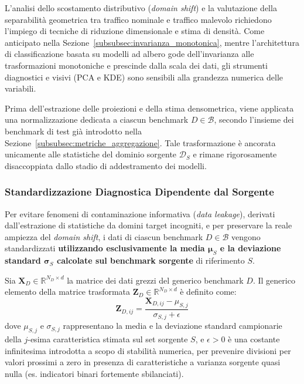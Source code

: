 L'analisi dello scostamento distributivo (\textit{domain shift}) e la valutazione della separabilità geometrica tra traffico nominale e traffico malevolo richiedono l'impiego di tecniche di riduzione dimensionale e stima di densità. Come anticipato nella Sezione~\ref{subsubsec:invarianza_monotonica}, mentre l'architettura di classificazione basata su modelli ad albero gode dell'invarianza alle trasformazioni monotoniche e prescinde dalla scala dei dati, gli strumenti diagnostici e visivi (PCA e KDE) sono sensibili alla grandezza numerica delle variabili.

Prima dell'estrazione delle proiezioni e della stima densometrica, viene applicata una normalizzazione dedicata a ciascun benchmark $D \in \mathcal{B}$, secondo l'insieme dei benchmark di test già introdotto nella Sezione~\ref{subsubsec:metriche_aggregazione}. Tale trasformazione è ancorata unicamente alle statistiche del dominio sorgente $\mathcal{D}_S$ e rimane rigorosamente disaccoppiata dallo stadio di addestramento dei modelli.

\subsubsection{Standardizzazione Diagnostica Dipendente dal Sorgente}
\label{subsubsec:zscore_sorgente}
Per evitare fenomeni di contaminazione informativa (\textit{data leakage}), derivati dall'estrazione di statistiche da domini target incogniti, e per preservare la reale ampiezza del \textit{domain shift}, i dati di ciascun benchmark $D \in \mathcal{B}$ vengono standardizzati \textbf{utilizzando esclusivamente la media $\boldsymbol{\mu}_S$ e la deviazione standard $\boldsymbol{\sigma}_S$ calcolate sul benchmark sorgente} di riferimento $S$.

Sia $\mathbf{X}_D \in \mathbb{R}^{N_D \times d}$ la matrice dei dati grezzi del generico benchmark $D$. Il generico elemento della matrice trasformata $\mathbf{Z}_D \in \mathbb{R}^{N_D \times d}$ è definito come:
\begin{equation}
    \mathbf{Z}_{D, ij} = \frac{\mathbf{X}_{D, ij} - \mu_{S, j}}{\sigma_{S, j} + \epsilon}
    \label{eq:z_score_source}
\end{equation}
dove $\mu_{S, j}$ e $\sigma_{S, j}$ rappresentano la media e la deviazione standard campionarie della $j$-esima caratteristica stimata sul set sorgente $S$, e $\epsilon > 0$ è una costante infinitesima introdotta a scopo di stabilità numerica, per prevenire divisioni per valori prossimi a zero in presenza di caratteristiche a varianza sorgente quasi nulla (es. indicatori binari fortemente sbilanciati).

